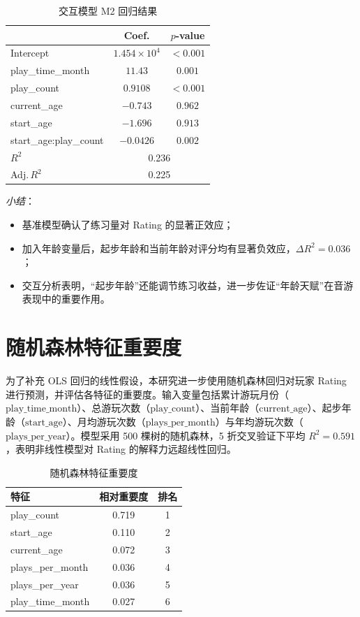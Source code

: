 \documentclass[12pt]{article}
\begin{document}
\begin{table}[htbp]
	\centering
	\caption{交互模型 M2 回归结果}\label{tab:m2}
	\begin{tabular}{lcc}
		\toprule
		& Coef.      & $p$-value  \\\midrule
		Intercept             & $1.454\times10^4$ & $<0.001$ \\
		play\_time\_month       & $11.43$     & $0.001$  \\
		play\_count             & $0.9108$    & $<0.001$ \\
		current\_age            & $-0.743$    & $0.962$  \\
		start\_age              & $-1.696$    & $0.913$  \\
		start\_age:play\_count  & $-0.0426$   & $0.002$  \\
		\midrule
		$R^2$                 & \multicolumn{2}{c}{0.236} \\
		Adj.\,$R^2$           & \multicolumn{2}{c}{0.225} \\
		\bottomrule
	\end{tabular}
\end{table}

\noindent\emph{小结}：  
\begin{itemize}
	\item 基准模型确认了练习量对 Rating 的显著正效应；  
	\item 加入年龄变量后，起步年龄和当前年龄对评分均有显著负效应，$\Delta R^2=0.036$；  
	\item 交互分析表明，“起步年龄”还能调节练习收益，进一步佐证“年龄天赋”在音游表现中的重要作用。  
\end{itemize}

\section{随机森林特征重要度}

为了补充 OLS 回归的线性假设，本研究进一步使用随机森林回归对玩家 Rating 进行预测，并评估各特征的重要度。输入变量包括累计游玩月份（\(\text{play\_time\_month}\)）、总游玩次数（\(\text{play\_count}\)）、当前年龄（\(\text{current\_age}\)）、起步年龄（\(\text{start\_age}\)）、月均游玩次数（\(\text{plays\_per\_month}\)）与年均游玩次数（\(\text{plays\_per\_year}\)）。模型采用 500 棵树的随机森林，5 折交叉验证下平均 \(R^2=0.591\)，表明非线性模型对 Rating 的解释力远超线性回归。

\begin{table}[htbp]
	\centering
	\caption{随机森林特征重要度}\label{tab:rf_importance}
	\begin{tabular}{lcc}
		\toprule
		特征               & 相对重要度 & 排名 \\\midrule
		play\_count       & 0.719  & 1 \\
		start\_age        & 0.110  & 2 \\
		current\_age      & 0.072  & 3 \\
		plays\_per\_month & 0.036  & 4 \\
		plays\_per\_year  & 0.036  & 5 \\
		play\_time\_month & 0.027  & 6 \\
		\bottomrule
	\end{tabular}
\end{table}
\end{document}
